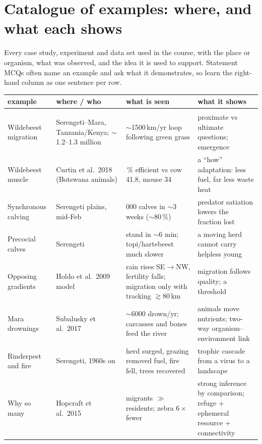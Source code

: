 \section{Catalogue of examples: where, and what each shows}\label{sec:examples}
Every case study, experiment and data set used in the course, with the place or organism, what was observed, and the
idea it is used to support. Statement MCQs often name an example and ask what it demonstrates, so learn the right-hand
column as one sentence per row.

{\small
\renewcommand{\arraystretch}{1.3}
\begin{longtable}{>{\raggedright\arraybackslash}p{}>{\raggedright\arraybackslash}p{}>{\raggedright\arraybackslash}p{}>{\raggedright\arraybackslash}p{}}
\toprule
example & where / who & what is seen & what it shows\\\midrule
\endhead
\multicolumn{4}{l}{\textbf{EE01 Biology and ecological thinking}}\\
Wildebeest migration & Serengeti--Mara, Tanzania/Kenya; $\sim$1.2--1.3 million & $\sim$1500\,km/yr loop following green grass & proximate vs ultimate questions; emergence\\
Wildebeest muscle & Curtin et al.\ 2018 (Botswana animals) & 62.6\,\% efficient vs cow 41.8, mouse 34 & a ``how'' adaptation: less fuel, far less waste heat\\
Synchronous calving & Serengeti plains, mid-Feb & 250{,}000 calves in $\sim$3 weeks ($\sim$80\,\%) & predator satiation lowers the fraction lost\\
Precocial calves & Serengeti & stand in $\sim$6 min; topi/hartebeest much slower & a moving herd cannot carry helpless young\\
Opposing gradients & Holdo et al.\ 2009 model & rain rises SE$\to$NW, fertility falls; migration only with tracking $\gtrsim$80\,km & migration follows quality; a threshold\\
Mara drownings & Subalusky et al.\ 2017 & $\sim$6000 drown/yr; carcasses and bones feed the river & animals move nutrients; two-way organism--environment link\\
Rinderpest and fire & Serengeti, 1960s on & herd surged, grazing removed fuel, fire fell, trees recovered & trophic cascade from a virus to a landscape\\
Why so many & Hopcraft et al.\ 2015 & migrants $\gg$ residents; zebra $6\times$ fewer & strong inference by comparison; refuge + ephemeral resource + connectivity\\

\end{longtable}}
